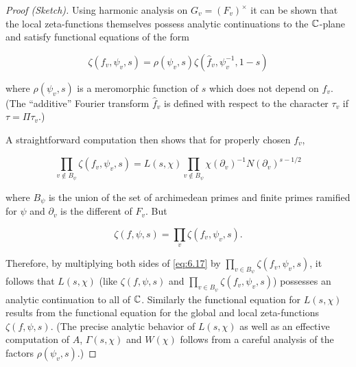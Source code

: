 \begin{proof}[Proof (Sketch)]

Using harmonic analysis on $G_v = (F_v)^{\times}$ it can be shown that the local zeta-functions themselves possess analytic continuations to the $\mathbb{C}$-plane and satisfy functional equations of the form

\begin{equation}\label{eq:6.16}
\zeta(f_v, \psi_v, s) = \rho(\psi_v, s)\zeta(\hat{f}_v, \psi_v^{-1}, 1 - s)\tag{6.16}
\end{equation}

where $\rho(\psi_v, s)$ is a meromorphic function of $s$ which does not depend on $f_v$. (The ``additive'' Fourier transform $\hat{f}_v$ is defined with respect to the character $\tau_v$ if $\tau = \Pi\tau_v$.)

A straightforward computation then shows that for properly chosen $f_v$,

\begin{equation}\label{eq:6.17}
\prod_{v \notin B_{\psi}} \zeta(f_v, \psi_v, s) = L(s, \chi) \prod_{v \notin B_{\psi}} \chi(\partial_v)^{-1} N(\partial_v)^{s - 1/2}\tag{6.17}
\end{equation}

where $B_{\psi}$ is the union of the set of archimedean primes and finite primes ramified for $\psi$ and $\partial_v$ is the different of $F_v$. But

\[
\zeta(f, \psi, s) = \prod_v \zeta(f_v, \psi_v, s).
\]

Therefore, by multiplying both sides of \eqref{eq:6.17} by $\prod_{v \in B_{\psi}} \zeta(f_v, \psi_v, s)$, it follows that $L(s, \chi)$ (like $\zeta(f, \psi, s)$ and $\prod_{v \in B_{\psi}} \zeta(f_v, \psi_v, s)$) possesses an analytic continuation to all of $\mathbb{C}$. Similarly the functional equation for $L(s, \chi)$ results from the functional equation for the global and local zeta-functions $\zeta(f, \psi, s)$. (The precise analytic behavior of $L(s, \chi)$ as well as an effective computation of $A$, $\Gamma(s, \chi)$ and $W(\chi)$ follows from a careful analysis of the factors $\rho(\psi_v, s)$.)

\end{proof}

